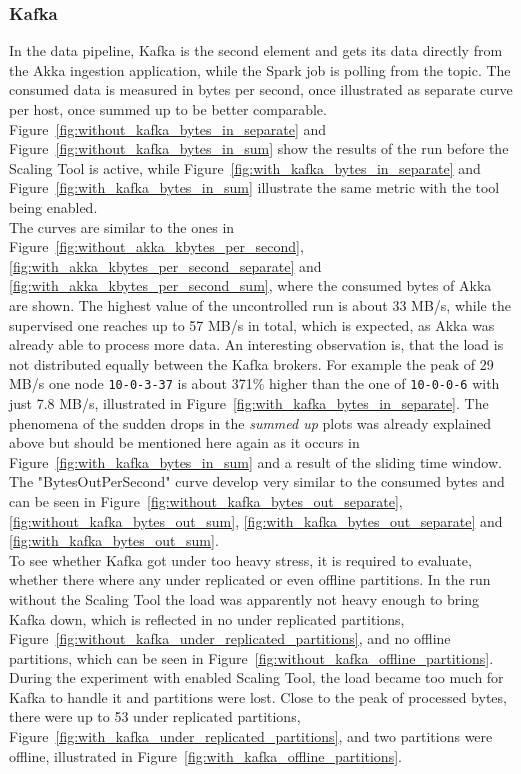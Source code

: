 \subsubsection{Kafka}
In the data pipeline, Kafka is the second element and gets its data directly from the Akka ingestion application, while the Spark job is polling from the topic.
The consumed data is measured in bytes per second, once illustrated as separate curve per host, once summed up to be better comparable.
Figure~\ref{fig:without_kafka_bytes_in_separate} and Figure~\ref{fig:without_kafka_bytes_in_sum} show the results of the run before the Scaling Tool is active,
while Figure~\ref{fig:with_kafka_bytes_in_separate} and Figure~\ref{fig:with_kafka_bytes_in_sum} illustrate the same metric with the tool being enabled.\\
The curves are similar to the ones in Figure~\ref{fig:without_akka_kbytes_per_second}, \ref{fig:with_akka_kbytes_per_second_separate} and \ref{fig:with_akka_kbytes_per_second_sum}, where the consumed bytes of Akka are shown.
The highest value of the uncontrolled run is about 33 MB/s, while the supervised one reaches up to 57 MB/s in total, which is expected, as Akka was already able to process more data.
An interesting observation is, that the load is not distributed equally between the Kafka brokers.
For example the peak of 29 MB/s one node \verb|10-0-3-37| is about 371\% higher than the one of \verb|10-0-0-6| with just 7.8 MB/s, illustrated in Figure~\ref{fig:with_kafka_bytes_in_separate}.
The phenomena of the sudden drops in the \textit{summed up} plots was already explained above but should be mentioned here again as it occurs in Figure~\ref{fig:with_kafka_bytes_in_sum} and a result of the sliding time window.\\
The "BytesOutPerSecond" curve develop very similar to the consumed bytes and can be seen in Figure~\ref{fig:without_kafka_bytes_out_separate}, \ref{fig:without_kafka_bytes_out_sum}, \ref{fig:with_kafka_bytes_out_separate} and \ref{fig:with_kafka_bytes_out_sum}.\\

To see whether Kafka got under too heavy stress, it is required to evaluate, whether there where any under replicated or even offline partitions.
In the run without the Scaling Tool the load was apparently not heavy enough to bring Kafka down, which is reflected in no under replicated partitions, Figure~\ref{fig:without_kafka_under_replicated_partitions}, and no offline partitions, which can be seen in Figure~\ref{fig:without_kafka_offline_partitions}.
During the experiment with enabled Scaling Tool, the load became too much for Kafka to handle it and partitions were lost.
Close to the peak of processed bytes, there were up to 53 under replicated partitions, Figure~\ref{fig:with_kafka_under_replicated_partitions}, and two partitions were offline, illustrated in Figure~\ref{fig:with_kafka_offline_partitions}.\\

